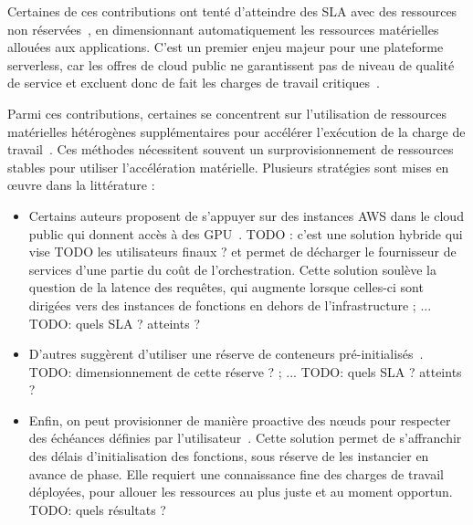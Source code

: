 Certaines de ces contributions ont tenté d'atteindre des \gls{SLA} avec des ressources non réservées~\cite{gujaratiSwayamDistributedAutoscaling2017, zhangMArkExploitingCloud, mampageDeadlineawareDynamicResource2021, singhviAtollScalableLowLatency2021, handaoui2020releaser, handaoui2020salamander, yallesRISCLESSReinforcementLearning}, en dimensionnant automatiquement les ressources matérielles allouées aux applications. C'est un premier enjeu majeur pour une plateforme serverless, car les offres de cloud public ne garantissent pas de niveau de qualité de service et excluent donc de fait les charges de travail critiques~\cite{buyyaSLAorientedResourceProvisioning2011}.

Parmi ces contributions, certaines se concentrent sur l'utilisation de ressources matérielles hétérogènes supplémentaires pour accélérer l'exécution de la charge de travail~\cite{zhangMArkExploitingCloud, lingPigeonDynamicEfficient2019, yangINFlessNativeServerless2022}. Ces méthodes nécessitent souvent un surprovisionnement de ressources stables pour utiliser l'accélération matérielle. Plusieurs stratégies sont mises en œuvre dans la littérature :

\begin{itemize}
    \item Certains auteurs proposent de s'appuyer sur des instances \gls{AWS} dans le cloud public qui donnent accès à des \gls{GPU}~\cite{zhangMArkExploitingCloud}. TODO : c'est une solution hybride qui vise TODO les utilisateurs finaux ? et permet de décharger le fournisseur de services d'une partie du coût de l'orchestration. Cette solution soulève la question de la latence des requêtes, qui augmente lorsque celles-ci sont dirigées vers des instances de fonctions en dehors de l'infrastructure ; ... TODO: quels SLA ? atteints ?
    \item D'autres suggèrent d'utiliser une réserve de conteneurs pré-initialisés~\cite{lingPigeonDynamicEfficient2019}. TODO: dimensionnement de cette réserve ? ; ... TODO: quels SLA ? atteints ?
    \item Enfin, on peut provisionner de manière proactive des nœuds pour respecter des échéances définies par l'utilisateur~\cite{singhviAtollScalableLowLatency2021}. Cette solution permet de s'affranchir des délais d'initialisation des fonctions, sous réserve de les instancier en avance de phase. Elle requiert une connaissance fine des charges de travail déployées, pour allouer les ressources au plus juste et au moment opportun. TODO: quels résultats ?
\end{itemize}

